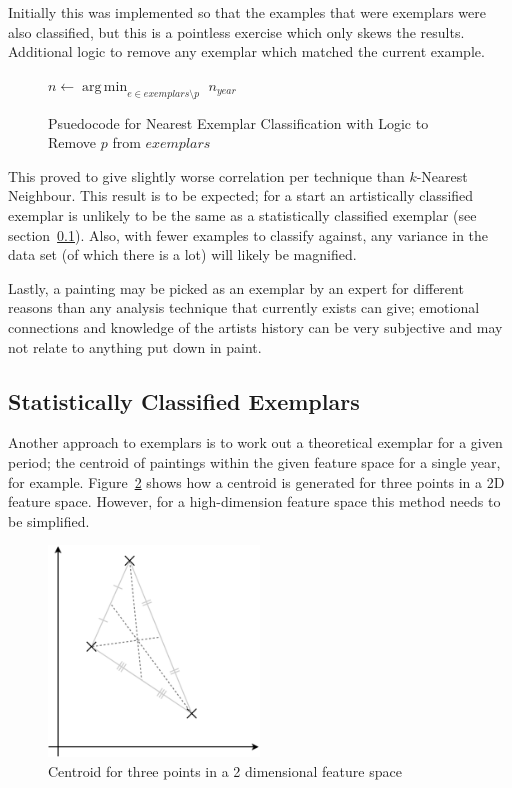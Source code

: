 Initially this was implemented so that the examples that were exemplars were also classified, but
this is a pointless exercise which only skews the results. Additional logic to remove any exemplar
which matched the current example.

\begin{figure}[h]
\begin{algorithmic}
\State $n \gets \operatorname*{arg\,min}_{e \in exemplars \setminus p}$ 
\State \Return $n_{year}$
\EndFunction
\end{algorithmic}
\caption[Psuedocode for Nearest Exemplar Classification with Added Logic]{Psuedocode for Nearest Exemplar Classification with Logic to Remove $p$ from $exemplars$}\label{fig:nec-psuedo}
\end{figure}

This proved to give slightly worse correlation per technique than $k$-Nearest Neighbour. This 
result is to be expected; for a start an artistically classified exemplar is unlikely to be the
same as a statistically classified exemplar (see section~\ref{sec:sce}). Also, with fewer examples
to classify against, any variance in the data set (of which there is a lot) will likely be 
magnified.

Lastly, a painting may be picked as an exemplar by an expert for different reasons than any
analysis technique that currently exists can give; emotional connections and knowledge of the
artists history can be very subjective and may not relate to anything put down in paint.


\subsection{Statistically Classified Exemplars}\label{sec:sce}

Another approach to exemplars is to work out a theoretical exemplar for a given period; the 
centroid of paintings within the given feature space for a single year, for example. 
Figure~\ref{fig:centroid} shows how a centroid is generated for three points in a 2D feature
space. However, for a high-dimension feature space this method needs to be simplified.

\begin{figure}[h]
\centering
\includegraphics[width=0.5\textwidth]{img/centroid.pdf}
\caption{Centroid for three points in a 2 dimensional feature space}\label{fig:centroid}
\end{figure}

